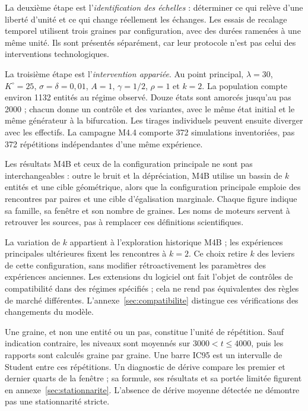 La deuxième étape est l'\emph{identification des échelles} : déterminer ce
qui relève d'une liberté d'unité et ce qui change réellement les échanges.
Les essais de recalage temporel utilisent trois graines par configuration,
avec des durées ramenées à une même unité. Ils sont présentés séparément,
car leur protocole n'est pas celui des interventions technologiques.

La troisième étape est l'\emph{intervention appariée}. Au point principal,
$\lambda=30$, $K^\circ=25$, $\sigma=\delta=0{,}01$,
$A=1$, $\gamma=1/2$, $\rho=1$ et $k=2$. La population compte environ
1132 entités au régime observé. Douze états sont amorcés jusqu'au pas 2000 ;
chacun donne un contrôle et des variantes, avec le même état initial et le
même générateur à la bifurcation. Les tirages individuels peuvent ensuite
diverger avec les effectifs. La campagne M4.4 comporte 372 simulations
inventoriées, pas 372 répétitions indépendantes d'une même expérience.

Les résultats M4B et ceux de la configuration principale ne sont pas
interchangeables : outre le bruit et la dépréciation, M4B utilise un bassin
de $k$ entités et une cible géométrique, alors que la configuration principale
emploie des rencontres par paires et une cible d'égalisation marginale.
Chaque figure indique sa famille, sa fenêtre et son nombre de graines.
Les noms de moteurs servent à retrouver les sources, pas à remplacer ces
définitions scientifiques.

La variation de $k$ appartient à l'exploration historique M4B ; les
expériences principales ultérieures fixent les rencontres à $k=2$.
Ce choix retire $k$ des leviers de cette configuration, sans modifier
rétroactivement les paramètres des expériences anciennes. Les extensions
du logiciel ont fait l'objet de contrôles de compatibilité dans des
régimes spécifiés ; cela ne rend pas équivalentes des règles de marché
différentes. L'annexe~\ref{sec:compatibilite} distingue ces vérifications
des changements du modèle.

Une graine, et non une entité ou un pas, constitue l'unité de répétition.
Sauf indication contraire, les niveaux sont moyennés sur $3000<t\le4000$,
puis les rapports sont calculés graine par graine. Une barre IC95 est un
intervalle de Student entre ces répétitions. Un diagnostic de dérive compare
les premier et dernier quarts de la fenêtre ; sa formule, ses résultats et
sa portée limitée figurent en annexe~\ref{sec:stationnarite}. L'absence de
dérive moyenne détectée ne démontre pas une stationnarité stricte.

